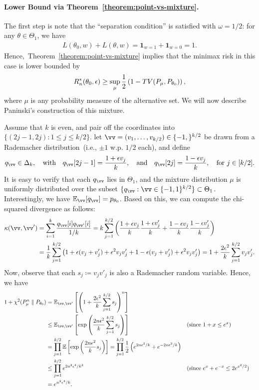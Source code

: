 \documentclass[12pt]{article}
\begin{document}
\paragraph{Lower Bound via Theorem~\ref{theorem:point-vs-mixture}.} The first step is note that the ``separation condition'' is satisfied with $\omega = 1/2$: for any $\theta \in \Theta_1$, we have 
\begin{align}
L(\theta_0, w) + L(\theta, w) = \boldsymbol{1}_{w=1} + \boldsymbol{1}_{w=0} = 1. 
\end{align}
Hence,~Theorem~\ref{theorem:point-vs-mixture} implies that the minimax risk in this case is lower bounded  by 
\begin{align}
R_n^*(\theta_0, \epsilon) \geq \sup_{\mu} \frac{1}{2}\left( 1 - TV(P_\mu, P_{\theta_0}) \right),
\end{align}
where $\mu$ is any probability measure of the alternative set. We will now describe Paninski's construction of this mixture. 

Assume that $k$ is even, and pair off the coordinates into $\{(2j-1, 2j): 1 \leq j \leq k/2\}$. let $\vv = (v_1, \ldots, v_{k/2}) \in \{-1, \}^{k/2}$ be drawn \iid from a Rademacher distribution~(i.e., $\pm 1$ w.p. $1/2$ each), and define 
\begin{align}
q_{\vv} \in \Delta_k, \qtext{with}
q_{\vv}[2j-1] = \frac{1+\epsilon v_j}{k}, \qtext{and} 
q_{\vv}[2j] = \frac{1- \epsilon v_j}{k}, \quad \text{for } j \in [k/2]. 
\end{align}
It is easy to verify that each $q_{\vv}$ lies in $\Theta_1$, and the mixture distribution $\mu$ is uniformly distributed over the subset $\{q_{\vv}: \vv \in \{-1, 1\}^{k/2} \} \subset \Theta_1$. Interestingly, we have $\mathbb{E}_{\vv}[q_{\vv}] = p_{\theta_0}$. 
Based on this, we can compute the chi-squared divergence as follows: 
\begin{align}
\kappa(\vv, \vv') &= \sum_{i=1}^k \frac{q_{\vv}[i] q_{\vv'}[i]}{1/k} = k \sum_{j=1}^{k/2} \lp \frac{1 + \epsilon v_j}{k} \frac{1 + \epsilon v'_j}{k} + \frac{1 - \epsilon v_j}{k} \frac{1 - \epsilon v'_j}{k} \rp \\
& = \frac{1}{k} \sum_{j=1}^{k/2} \lp 1 + \epsilon(v_j+v'_j) + \epsilon^2v_jv'_j + 1 - \epsilon(v_j + v'_j) + \epsilon^2 v_j v'_j \rp = 1 + \frac{2 \epsilon^2}{k} \sum_{j=1}^{k/2} v_j v'_j. 
\end{align}
Now, observe that each $s_j \coloneqq v_j v'_j$ is also a Rademacher random variable. Hence, we have 
\begin{align}
1 + \chi^2(P_{\mu}^n \parallel P_{\theta_0}) &= \mathbb{E}_{\vv, \vv'} \lb \lp 1 + \frac{2 \epsilon^2}{k} \sum_{j=1}^{k/2} s_j \rp^n \rb \\
& \leq \mathbb{E}_{\vv, \vv'} \lb \exp \lp \frac{2n \epsilon^2}{k} \sum_{j=1}^{k/2} s_j \rp \rb && (\text{since } 1 + x \leq e^x) \\
& =  \prod_{j=1}^{k/2} \mathbb{E}\lb \exp \lp \frac{2n \epsilon^2}{k}  s_j \rp \rb  = \prod_{j=1}^{k/2} \frac 1 2 \lp e^{2n\epsilon^2/k} + e^{-2n\epsilon^2/k} \rp \\
& \leq  \prod_{j=1}^{k/2} e^{2n^2 \epsilon^4/k^2} && (\text{since } e^x + e^{-x} \leq 2 e^{x^2/2}) \\
& = e^{n^2 \epsilon^4/k}. 
\end{align}
\end{document}
